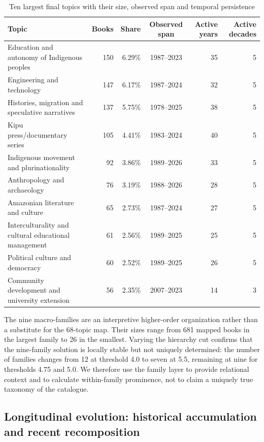 \documentclass[futureinternet,article,submit,moreauthors]{Definitions/mdpi}
\begin{document}
\begin{table}[htbp]
\caption{Ten largest final topics with their size, observed span and temporal persistence}\label{tab:largesttopics}
\small
\setlength{\tabcolsep}{4pt}
\begin{tabularx}{\textwidth}{@{}Yrrcrr@{}}
\toprule
Topic & Books & Share & Observed span & Active years & Active decades \\
\midrule
Education and autonomy of Indigenous peoples & 150 & 6.29\% & 1987--2023 & 35 & 5 \\
Engineering and technology & 147 & 6.17\% & 1987--2024 & 32 & 5 \\
Histories, migration and speculative narratives & 137 & 5.75\% & 1978--2025 & 38 & 5 \\
Kipu press/documentary series & 105 & 4.41\% & 1983--2024 & 40 & 5 \\
Indigenous movement and plurinationality & 92 & 3.86\% & 1989--2026 & 33 & 5 \\
Anthropology and archaeology & 76 & 3.19\% & 1988--2026 & 28 & 5 \\
Amazonian literature and culture & 65 & 2.73\% & 1987--2024 & 27 & 5 \\
Interculturality and cultural educational management & 61 & 2.56\% & 1989--2025 & 25 & 5 \\
Political culture and democracy & 60 & 2.52\% & 1989--2025 & 26 & 5 \\
Community development and university extension & 56 & 2.35\% & 2007--2023 & 14 & 3 \\
\bottomrule
\end{tabularx}
\end{table}

The nine macro-families are an interpretive higher-order organization rather than a substitute for the 68-topic map. Their sizes range from 681 mapped books in the largest family to 26 in the smallest. Varying the hierarchy cut confirms that the nine-family solution is locally stable but not uniquely determined: the number of families changes from 12 at threshold 4.0 to seven at 5.5, remaining at nine for thresholds 4.75 and 5.0. We therefore use the family layer to provide relational context and to calculate within-family prominence, not to claim a uniquely true taxonomy of the catalogue.

\subsection{Longitudinal evolution: historical accumulation and recent recomposition}\label{subsec:temporal}
\end{document}
